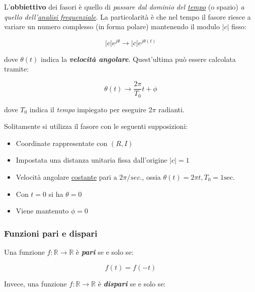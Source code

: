 \documentclass[a4paper]{article}
\begin{document}
	L'\textbf{obbiettivo} dei fasori è quello di \emph{passare dal dominio del \underline{tempo}} (o spazio) \emph{a quello dell'\underline{analisi frequenziale}}.\newline
	La particolarità è che nel tempo il fasore riesce a variare un numero complesso (in forma polare) mantenendo il modulo $|c|$ fisso:

	\begin{equation*}
		|c| e^{j\theta} \rightarrow |c| e^{j\theta{(t)}}
	\end{equation*}

	\noindent
	dove $\theta{(t)}$ indica la \textbf{\emph{velocità angolare}}. Quest'ultima può essere calcolata tramite:
	
	\begin{equation*}
		\theta{(t)} \longrightarrow \dfrac{2\pi}{T_0} t + \phi
	\end{equation*}

	\noindent
	dove $T_0$ indica il \emph{tempo} impiegato per eseguire $2\pi$ radianti.
	
	Solitamente si utilizza il fasore con le seguenti supposizioni:
	
	\begin{itemize}
		\item[\ding{45}] Coordinate rappresentate con $(R, I)$
		\item[\ding{45}] Impostata una distanza unitaria fissa dall'origine $|c| = 1$
		\item[\ding{45}] Velocità angolare \underline{costante} pari a $2\pi/sec.$, ossia $\theta{(t)} = 2\pi t, T_0 = 1\mathrm{sec.}$
		\item[\ding{45}] Con $t = 0$ si ha $\theta = 0$
		\item[\ding{45}] Viene mantenuto $\phi = 0$
	\end{itemize}

	\newpage
	
	\subsubsection{Funzioni pari e dispari}
	
	Una funzione $f:\mathbb{R}\rightarrow\mathbb{R}$ è \textbf{\emph{pari}} se e solo se:
	
	\begin{equation*}
		f(t) = f(-t)
	\end{equation*}

	\noindent
	Invece, una funzione $f:\mathbb{R}\rightarrow\mathbb{R}$ è \textbf{\emph{dispari}} se e solo se:
	
\end{document}
